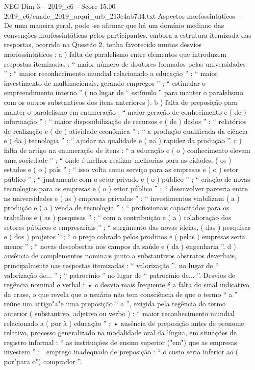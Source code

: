 \begin{textsample}{NEG Dim 3 – 2019\_c6 – Score 15.00 – 2019\_c6/enade\_2019\_arqui\_urb\_213c4ab7d4.txt}
Aspectos morfossintáticos – De uma maneira geral, pode -se afirmar que há um domínio mediano das convenções morfossintáticas pelos participantes, embora a estrutura itemizada das respostas, ocorrida na Questão 2, tenha favorecido muitos desvios morfossintáticos : a ) falta de paralelismo entre elementos que introduzem respostas itemizadas : “ maior número de doutores formados pelas universidades ” ; “ maior reconhecimento mundial relacionado a educação ” ; “ maior investimento de multinacionais, gerando empregos ” ; “ estimular o empreendimento interno ” ( no lugar de “ estímulo ” para manter o paralelismo com os outros substantivos dos itens anteriores ). b ) falta de preposição para manter o paralelismo em enumeração : “ maior geração de conhecimento e ( de ) informação ” ; “ maior disponibilização de recursos e ( de ) dados ” ; “ relatórios de realização e ( de ) atividade econômica ” ; “ a produção qualificada da ciência e ( da ) tecnologia ” ; “ ajudar na qualidade e ( na ) rapidez da produção ”. c ) falta de artigo na enumeração de itens : “ a educação e ( o ) conhecimento elevam uma sociedade ” ; “ onde é melhor realizar melhorias para as cidades, ( os ) estados e ( o ) país ” ; “ isso volta como serviço para as empresas e ( o ) setor público ” ; “ juntamente com o setor privado e ( o ) público ” ; “ criação de novas tecnologias para as empresas e ( o ) setor público ” ; “ desenvolver parceria entre as universidades e ( as ) empresas privadas ” ; “ investimentos viabilizam ( a ) produção e ( a ) venda de tecnologia ” ; “ profissionais capacitados para os trabalhos e ( as ) pesquisas ” ; “ com a contribuição e ( a ) colaboração dos setores públicos e empresariais ” ; “ surgimento das novas ideias, ( das ) pesquisas e ( dos ) projetos ” ; “ o preço cobrado pelos produtos e ( pelas ) empresas seria menor ” ; “ novas descobertas nos campos da saúde e ( da ) engenharia ”. d ) ausência de complementos nominais junto a substantivos abstratos deverbais, principalmente nas respostas itemizadas : “ valorização ”, no lugar de “ valorização de... ” ; “ patrocínio ” no lugar de “ patrocínio de... ”.
Desvios de regência nominal e verbal : • o desvio mais frequente é a falta do sinal indicativo da crase, o que revela que o usuário não tem consciência de que o termo “ a ” reúne um artigo"a"e uma preposição “ a ”, exigida pela regência do termo anterior ( substantivo, adjetivo ou verbo ) : “ maior reconhecimento mundial relacionado a ( por à ) educação ” ; • ausência de preposição antes de pronome relativo, processo generalizado na modalidade oral da língua, em situações de registro informal : “ as instituições de ensino superior ("em") que as empresas investem ” ;  emprego inadequado de preposição : “ o custo seria inferior ao ( por"para o") comprador ”.

\end{textsample}
